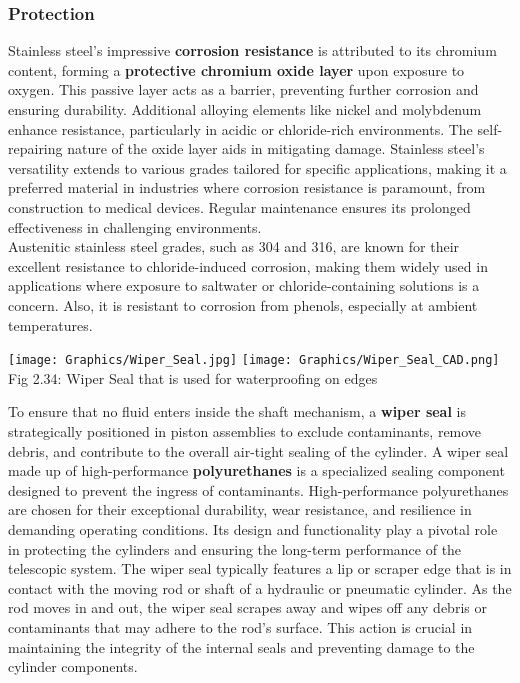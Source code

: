 \documentclass[a4,10pt]{report}
\begin{document}
\subsubsection{Protection}
Stainless steel's impressive \textbf{corrosion resistance} is attributed to its chromium content, forming a \textbf{protective chromium oxide layer} upon exposure to oxygen. This passive layer acts as a barrier, preventing further corrosion and ensuring durability. Additional alloying elements like nickel and molybdenum enhance resistance, particularly in acidic or chloride-rich environments. The self-repairing nature of the oxide layer aids in mitigating damage. Stainless steel's versatility extends to various grades tailored for specific applications, making it a preferred material in industries where corrosion resistance is paramount, from construction to medical devices. Regular maintenance ensures its prolonged effectiveness in challenging environments. 
\vspace{2mm} \\
Austenitic stainless steel grades, such as 304 and 316, are known for their excellent resistance to chloride-induced corrosion, making them widely used in applications where exposure to saltwater or chloride-containing solutions is a concern. Also, it is resistant to corrosion from phenols, especially at ambient temperatures. 
\vspace{2mm} \\
\begin{center}
    \texttt{[image: Graphics/Wiper\_Seal.jpg]}
    \texttt{[image: Graphics/Wiper\_Seal\_CAD.png]} \\
    \normalsize{Fig 2.34: Wiper Seal that is used for waterproofing on edges} \\
\end{center}
To ensure that no fluid enters inside the shaft mechanism, a \textbf{wiper seal} is strategically positioned in piston assemblies to exclude contaminants, remove debris, and contribute to the overall air-tight sealing of the cylinder. A wiper seal made up of high-performance\textbf{ polyurethanes }is a specialized sealing component designed to prevent the ingress of contaminants. High-performance polyurethanes are chosen for their exceptional durability, wear resistance, and resilience in demanding operating conditions. Its design and functionality play a pivotal role in protecting the cylinders and ensuring the long-term performance of the telescopic system.\cite{wiper_seal} The wiper seal typically features a lip or scraper edge that is in contact with the moving rod or shaft of a hydraulic or pneumatic cylinder. As the rod moves in and out, the wiper seal scrapes away and wipes off any debris or contaminants that may adhere to the rod's surface. This action is crucial in maintaining the integrity of the internal seals and preventing damage to the cylinder components.\cite{wiper_seal_material}
\end{document}
